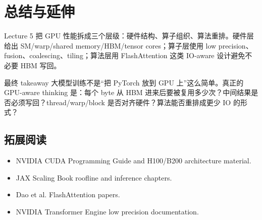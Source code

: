 \section{总结与延伸}
Lecture 5 把 GPU 性能拆成三个层级：硬件结构、算子组织、算法重排。硬件层给出 SM/warp/shared memory/HBM/tensor cores；算子层使用 low precision、fusion、coalescing、tiling；算法层用 FlashAttention 这类 IO-aware 设计避免不必要 HBM 写回。
\begin{importantbox}{最终 takeaway}
大模型训练不是“把 PyTorch 放到 GPU 上”这么简单。真正的 GPU-aware thinking 是：每个 byte 从 HBM 进来后要被复用多少次？中间结果是否必须写回？thread/warp/block 是否对齐硬件？算法能否重排成更少 IO 的形式？
\end{importantbox}
\subsection{拓展阅读}
\begin{itemize}
    \item NVIDIA CUDA Programming Guide and H100/B200 architecture material.
    \item JAX Scaling Book roofline and inference chapters.
    \item Dao et al. FlashAttention papers.
    \item NVIDIA Transformer Engine low precision documentation.
\end{itemize}

